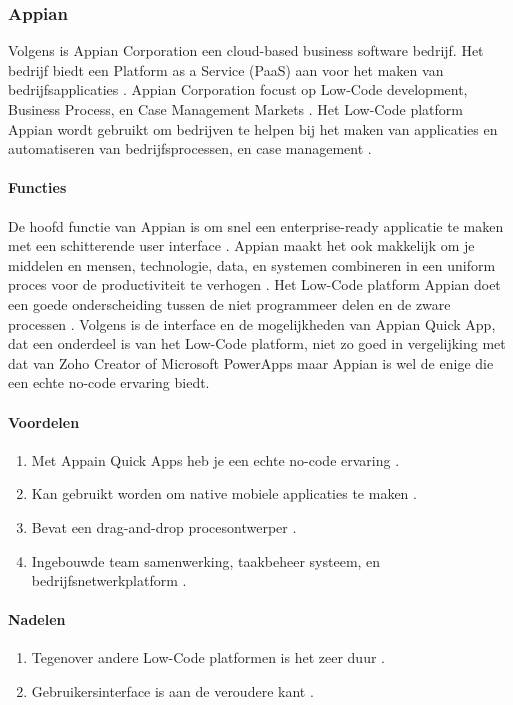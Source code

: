 \subsubsection*{Appian}
Volgens \textcite{Shala} is Appian Corporation een cloud-based business software bedrijf. Het bedrijf biedt een Platform as a Service (PaaS) aan voor het maken van bedrijfsapplicaties \autocite{Shala}.
Appian Corporation focust op Low-Code development, Business Process, en Case Management Markets \autocite{Shala}. Het Low-Code platform Appian wordt gebruikt om bedrijven te helpen
bij het maken van applicaties en automatiseren van bedrijfsprocessen, en case management \autocite{Shala}.
\paragraph{Functies}
De hoofd functie van Appian is om snel een enterprise-ready applicatie te maken met een schitterende user interface \autocite{Shala}. Appian maakt het ook makkelijk 
om je middelen en mensen, technologie, data, en systemen combineren in een uniform proces voor de productiviteit te verhogen \autocite{Shala}.
Het Low-Code platform Appian doet een goede onderscheiding tussen de niet programmeer delen en de zware processen \autocite{Marvin2017}.
Volgens \textcite{Marvin2017} is de interface en de mogelijkheden van Appian Quick App, dat een onderdeel is van het Low-Code platform, niet zo goed in vergelijking met dat van Zoho Creator of Microsoft PowerApps maar Appian is wel de enige die een echte no-code ervaring biedt.

\paragraph*{Voordelen}
\begin{enumerate}
    \item Met Appain Quick Apps heb je een echte no-code ervaring \autocite{Marvin2017}.
    \item Kan gebruikt worden om native mobiele applicaties te maken \autocite{Marvin2017}.
    \item Bevat een drag-and-drop procesontwerper \autocite{Marvin2017}.
    \item Ingebouwde team samenwerking, taakbeheer systeem, en bedrijfsnetwerkplatform \autocite{Marvin2017}.
\end{enumerate}


\paragraph*{Nadelen}
\begin{enumerate}
    \item Tegenover andere Low-Code platformen is het zeer duur \autocite{Marvin2017}.
    \item Gebruikersinterface is aan de veroudere kant \autocite{Marvin2017}.
\end{enumerate}

